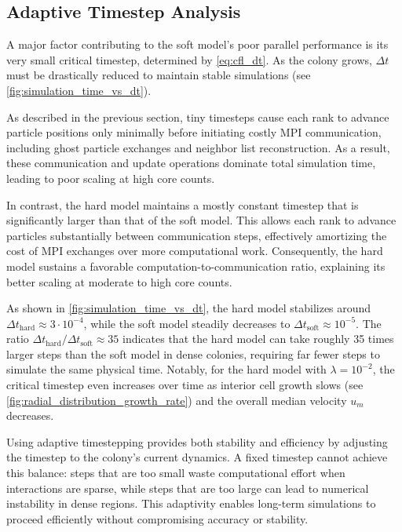 \documentclass[conference]{IEEEtran}
\begin{document}
\subsection{Adaptive Timestep Analysis}

A major factor contributing to the soft model's poor parallel performance is its very small critical timestep, determined by \autoref{eq:cfl_dt}. As the colony grows, $\Delta t$ must be drastically reduced to maintain stable simulations (see \autoref{fig:simulation_time_vs_dt}).

As described in the previous section, tiny timesteps cause each rank to advance particle positions only minimally before initiating costly MPI communication, including ghost particle exchanges and neighbor list reconstruction. As a result, these communication and update operations dominate total simulation time, leading to poor scaling at high core counts.

In contrast, the hard model maintains a mostly constant timestep that is significantly larger than that of the soft model. This allows each rank to advance particles substantially between communication steps, effectively amortizing the cost of MPI exchanges over more computational work. Consequently, the hard model sustains a favorable computation-to-communication ratio, explaining its better scaling at moderate to high core counts.

As shown in \autoref{fig:simulation_time_vs_dt}, the hard model stabilizes around $\Delta t_{\text{hard}} \approx 3 \cdot 10^{-4}$, while the soft model steadily decreases to $\Delta t_{\text{soft}} \approx 10^{-5}$. The ratio $\Delta t_{\text{hard}}/\Delta t_{\text{soft}} \approx 35$ indicates that the hard model can take roughly 35 times larger steps than the soft model in dense colonies, requiring far fewer steps to simulate the same physical time. Notably, for the hard model with $\lambda = 10^{-2}$, the critical timestep even increases over time as interior cell growth slows (see \autoref{fig:radial_distribution_growth_rate}) and the overall median velocity $u_m$ decreases.

Using adaptive timestepping provides both stability and efficiency by adjusting the timestep to the colony's current dynamics. A fixed timestep cannot achieve this balance: steps that are too small waste computational effort when interactions are sparse, while steps that are too large can lead to numerical instability in dense regions. This adaptivity enables long-term simulations to proceed efficiently without compromising accuracy or stability.
\end{document}

